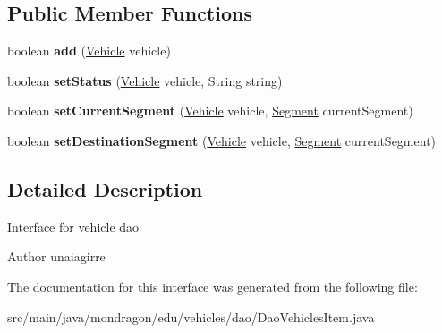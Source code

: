 \subsection*{Public Member Functions}
\begin{DoxyCompactItemize}
\item 
\mbox{\label{interfacemondragon_1_1edu_1_1vehicles_1_1dao_1_1_dao_vehicles_item_aae5ae49dece6fdc262f59766bf95c187}} 
boolean {\bfseries add} (\mbox{\hyperlink{classmondragon_1_1edu_1_1clases_1_1_vehicle}{Vehicle}} vehicle)
\item 
\mbox{\label{interfacemondragon_1_1edu_1_1vehicles_1_1dao_1_1_dao_vehicles_item_ab360d8c93c66b0c1be28918ff6812d63}} 
boolean {\bfseries set\+Status} (\mbox{\hyperlink{classmondragon_1_1edu_1_1clases_1_1_vehicle}{Vehicle}} vehicle, String string)
\item 
\mbox{\label{interfacemondragon_1_1edu_1_1vehicles_1_1dao_1_1_dao_vehicles_item_a553ee37f12546df3f2076b0a868b3dc2}} 
boolean {\bfseries set\+Current\+Segment} (\mbox{\hyperlink{classmondragon_1_1edu_1_1clases_1_1_vehicle}{Vehicle}} vehicle, \mbox{\hyperlink{classmondragon_1_1edu_1_1clases_1_1_segment}{Segment}} current\+Segment)
\item 
\mbox{\label{interfacemondragon_1_1edu_1_1vehicles_1_1dao_1_1_dao_vehicles_item_aeb999e13ad0f018eaae76f9b7e8bb5cf}} 
boolean {\bfseries set\+Destination\+Segment} (\mbox{\hyperlink{classmondragon_1_1edu_1_1clases_1_1_vehicle}{Vehicle}} vehicle, \mbox{\hyperlink{classmondragon_1_1edu_1_1clases_1_1_segment}{Segment}} current\+Segment)
\end{DoxyCompactItemize}


\subsection{Detailed Description}
Interface for vehicle dao

\begin{DoxyAuthor}{Author}
unaiagirre 
\end{DoxyAuthor}


The documentation for this interface was generated from the following file\+:\begin{DoxyCompactItemize}
\item 
src/main/java/mondragon/edu/vehicles/dao/Dao\+Vehicles\+Item.\+java\end{DoxyCompactItemize}
